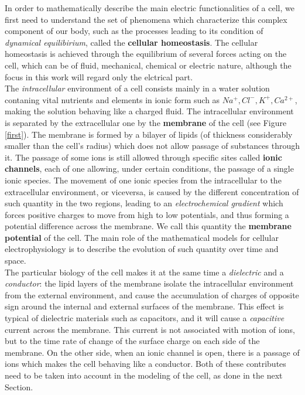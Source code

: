 \documentclass[12pt, a4paper]{article}
\begin{document}
In order to mathematically describe the main electric functionalities of a cell, we first need to understand the set of phenomena which characterize this complex component of our body, such as the processes leading to its condition of \textit{dynamical equilibirium}, called the \textbf{cellular homeostasis}. The cellular homeostasis is achieved through the equilibrium of several forces acting on the cell, which can be of fluid, mechanical, chemical or electric nature, although the focus in this work will regard only the elctrical part.\\
The \textit{intracellular} environment of a cell consists mainly in a water solution contaning vital nutrients and elements in ionic form such as  $Na^+, Cl^-, K^+, Ca^{2+}$, making the solution behaving like a charged fluid. The intracellular environment is separated by the extracellular one by the \textbf{membrane} of the cell (see Figure \ref{first}). The membrane is formed by a bilayer of lipids (of thickness considerably smaller than the cell's radius) which does not allow passage of substances through it. The passage of some ions is still allowed through specific sites called \textbf{ionic channels}, each of one allowing, under certain conditions, the passage of a single ionic species. The movement of one ionic species from the intracellular to the extracellular environment, or viceversa, is caused by the different concentration of such quantity in the two regions, leading to an \textit{electrochemical gradient} which forces positive charges to move from high to low potentials, and thus forming a potential difference across the membrane. We call this quantity the \textbf{membrane potential} of the cell. The main role of the mathematical models for cellular electrophysiology is to describe the evolution of such quantity over time and space.
\\

The particular biology of the cell makes it at the same time a \textit{dielectric} and a \textit{conductor}: the lipid layers of the membrane isolate the intracellular environment from the external environment, and cause the accumulation of charges of opposite sign around the internal and external surfaces of the membrane. This effect is typical of dielectric materials such as capacitors, and it will cause a \textit{capacitive} current across the membrane. This current is not associated with motion of ions, but to the time rate of change of the surface charge on each side of the membrane. On the other side, when an ionic channel is open, there is a passage of ions which makes the cell behaving like a conductor. Both of these contributes need to be taken into account in the modeling of the cell, as done in the next Section.
\\
\end{document}
